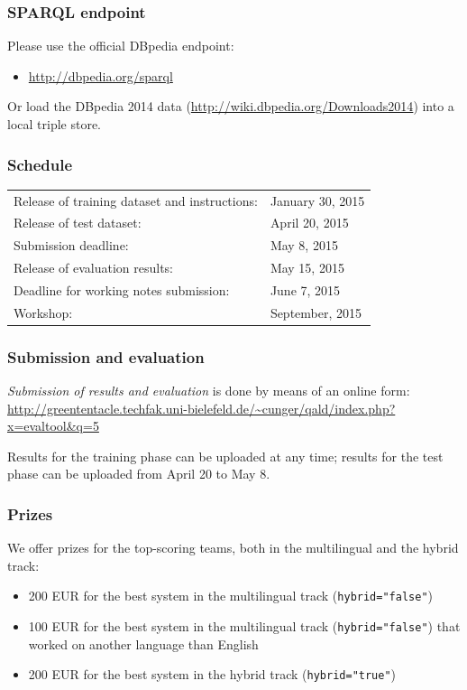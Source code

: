 \documentclass[a4paper]{article}
\begin{document}
{\subsubsection*{SPARQL endpoint}

Please use the official DBpedia endpoint:
\begin{itemize}
\item[] \url{http://dbpedia.org/sparql}
\end{itemize}
Or load the DBpedia 2014 data (\url{http://wiki.dbpedia.org/Downloads2014}) into a local triple store.

\subsubsection*{Schedule}

\begin{tabular}{ll}
Release of training dataset and instructions: & January 30, 2015 \\
Release of test dataset: & April 20, 2015 \\
Submission deadline: & May 8, 2015 \\
Release of evaluation results: & May 15, 2015 \\
Deadline for working notes submission: & June 7, 2015 \\
Workshop: & September, 2015 \\
\end{tabular}

\subsubsection*{Submission and evaluation}

{\em Submission of results and evaluation} is done by means of an online form:\\
\url{http://greententacle.techfak.uni-bielefeld.de/~cunger/qald/index.php?x=evaltool&q=5}

Results for the training phase can be uploaded at any time; results for the test phase can be uploaded from April 20 to May 8.

\subsubsection*{Prizes}

We offer prizes for the top-scoring teams, both in the multilingual and the hybrid track: 
\begin{itemize}
\item 200 EUR for the best system in the multilingual track (\texttt{hybrid="false"})
\item 100 EUR for the best system in the multilingual track (\texttt{hybrid="false"}) that worked on another language than English  
\item 200 EUR for the best system in the hybrid track (\texttt{hybrid="true"})
\end{itemize}

}
\end{document}
